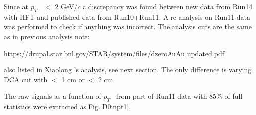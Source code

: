 \clearpage

\newcommand{\ttbs}{\char'134}
\newcommand{\pt}{$p_{T}$ }
\newcommand{ \bfg }{\begin{figure}[]}
\newcommand{ \efg }{\end{figure}}
\newcommand{\dzero}{$D^{0}$ }




Since at \pt\ $<$ 2 GeV/$c$ a discrepancy was found between new data from Run14 with HFT and published data from Run10+Run11. A re-analysis on Run11 data was performed to check if anything was incorrect. The analysis cuts are the same as in previous analysis note:

https://drupal.star.bnl.gov/STAR/system/files/dzeroAuAu$\_$updated.pdf

also listed in Xiaolong 's analysis, see next section. The only difference is varying DCA cut with $<$ 1 cm or $<$ 2 cm.

The raw signals as a function of \pt\ from part of Run11 data with 85\% of full statistics were extracted as Fig.\ref{D0inpt1},

